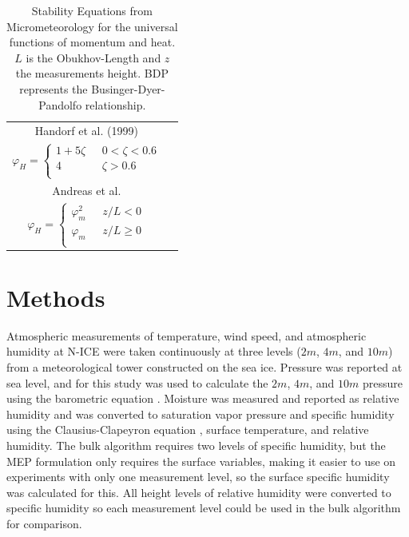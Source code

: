 {\begin{table}[p]
\begin{tabular}{| c | c |}
        Handorf et al. (1999) \cite{handorf:1999} & \shortstack{$\varphi_{m} = \begin{cases} 1 + 5 \zeta & \text{    } 0 < \zeta < 0.6 \\ 4 & \text{    } \zeta > 0.6 \\ \end{cases}$\\$\varphi_{H} = \begin{cases} 1 + 5 \zeta & \text{    } 0 < \zeta < 0.6 \\ 4 & \text{    } \zeta > 0.6 \\ \end{cases}$ } \\ 
        Andreas et al. \cite{andreas:2009} & \shortstack{$\varphi_{m} = \begin{cases} BDP(\gamma = 16) & \text{    } z/L < 0 \\ -5z/L & \text{    } z/L \geq 0 \\ \end{cases}$ \\ $\varphi_{H} = \begin{cases} \varphi_{m}^{2} & \text{    } z/L < 0 \\ \varphi_{m} & \text{    } z/L \geq 0 \\ \end{cases}$ } \\ 
        \hline
    \end{tabular}
    \caption{Stability Equations from Micrometeorology \cite{foken:2008} for the universal functions of momentum and heat. $L$ is the Obukhov-Length and $z$ the measurements height. BDP represents the Businger-Dyer-Pandolfo relationship\cite{foken:2008}.}
    \label{tab:stability}
\end{table}}

\section{Methods}
Atmospheric measurements of temperature, wind speed, and atmospheric humidity at N-ICE were taken continuously at three levels ($2 m$, $4 m$, and $10 m$) from a meteorological tower constructed on the sea ice. Pressure was reported at sea level, and for this study was used to calculate the $2 m$, $4 m$, and $10 m$ pressure using the barometric equation \cite{lente:2020}. Moisture was measured and reported as relative humidity and was converted to saturation vapor pressure and specific humidity using the Clausius-Clapeyron equation \cite{iribarne:2981}, surface temperature, and relative humidity. The bulk algorithm requires two levels of specific humidity, but the MEP formulation only requires the surface variables, making it easier to use on experiments with only one measurement level, so the surface specific humidity was calculated for this. All height levels of relative humidity were converted to specific humidity so each measurement level could be used in the bulk algorithm for comparison. 

